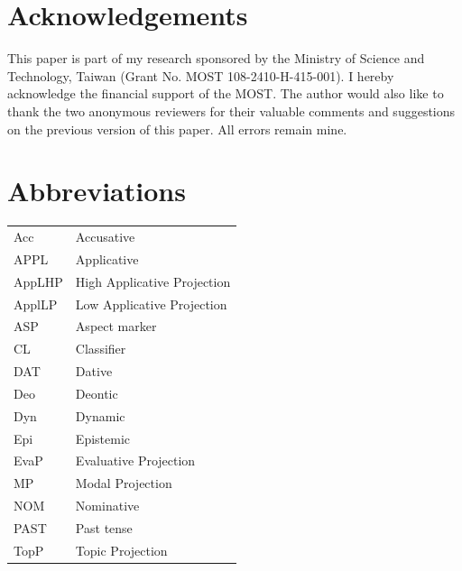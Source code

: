 \documentclass[output=paper,colorlinks,citecolor=brown]{langscibook}
\begin{document}
\section*{Acknowledgements}
This paper is part of my research sponsored by the Ministry of Science and Technology, Taiwan (Grant No. MOST 108-2410-H-415-001). I hereby acknowledge the financial support of the MOST. The author would also like to thank the two anonymous reviewers for their valuable comments and suggestions on the previous version of this paper. All errors remain mine.


\section*{Abbreviations}

\begin{tabularx}{\textwidth}{lQ}

Acc & Accusative\\* 
APPL & Applicative\\* 
AppLHP & High Applicative Projection\\* 
ApplLP & Low Applicative Projection\\*
ASP & Aspect marker\\* 
CL & Classifier\\*
DAT & Dative\\*
Deo & Deontic\\*
Dyn & Dynamic\\* 
Epi & Epistemic\\*
EvaP & Evaluative Projection\\* 
MP & Modal Projection\\* 
NOM & Nominative\\* 
PAST & Past tense\\* 
TopP & Topic Projection
\end{tabularx}



\printbibliography[heading=subbibliography,notkeyword=this]
\end{document}
